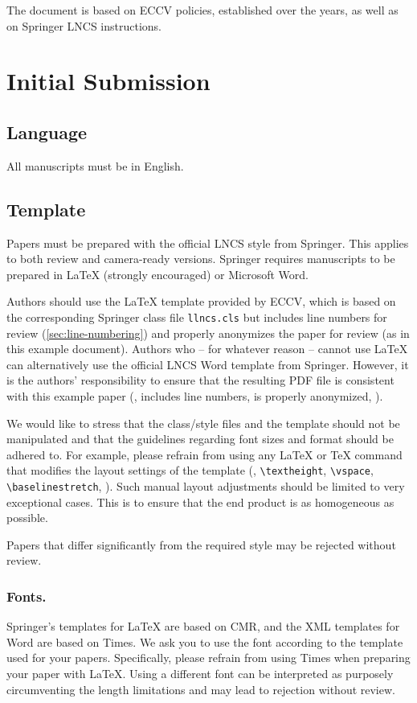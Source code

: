 \documentclass[runningheads]{llncs}
\begin{document}
The document is based on ECCV policies, established over the years, as well as on Springer LNCS instructions.

\section{Initial Submission}

\subsection{Language}
All manuscripts must be in English.


\subsection{Template}
Papers must be prepared with the official LNCS style from Springer.
This applies to both review and camera-ready versions.
Springer requires manuscripts to be prepared in \LaTeX{} (strongly encouraged) or Microsoft Word. 

Authors should use the \LaTeX{} template provided by ECCV, which is based on the corresponding Springer class file \texttt{llncs.cls} but includes line numbers for review (\cref{sec:line-numbering}) and properly anonymizes the paper for review (as in this example document).
Authors who -- for whatever reason -- cannot use \LaTeX{} can alternatively use the official LNCS Word template from Springer.
However, it is the authors' responsibility to ensure that the resulting PDF file is consistent with this example paper (\ie, includes line numbers, is properly anonymized, \etc).

We would like to stress that the class/style files and the template should not be manipulated and that the guidelines regarding font sizes and format should be adhered to. 
For example, please refrain from using any \LaTeX{} or \TeX{} command that modifies the layout settings of the template (\eg, \verb+\textheight+, \verb+\vspace+, \verb+\baselinestretch+, \etc).
Such manual layout adjustments should be limited to very exceptional cases.
This is to ensure that the end product is as homogeneous as possible.

Papers that differ significantly from the required style may be rejected without review.


\subsubsection{Fonts.}
Springer's templates for \LaTeX{} are based on CMR, and the XML templates for Word are based on Times. 
We ask you to use the font according to the template used for your papers. 
Specifically, please refrain from using Times when preparing your paper with \LaTeX{}.
Using a different font can be interpreted as purposely circumventing the length limitations and may lead to rejection without review.
\end{document}
